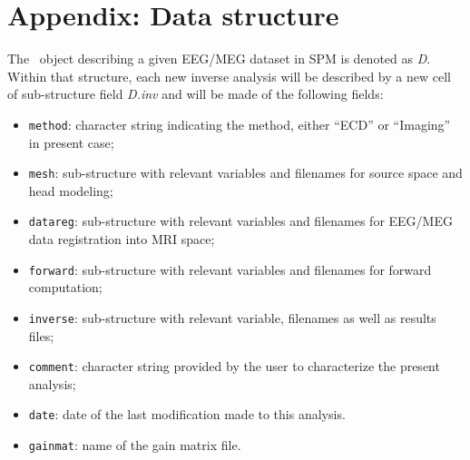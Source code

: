 \section{Appendix: Data structure}
The \matlab\ object describing a given EEG/MEG dataset in SPM is denoted as \textit{D}.
Within that structure, each new inverse analysis will be described by a new cell of sub-structure
field \textit{D.inv} and will be made of the following fields:

\begin{itemize}
    \item \texttt{method}: character string indicating the method, either ``ECD'' or ``Imaging'' in present case;
    \item \texttt{mesh}: sub-structure with relevant variables and filenames for source space and head modeling;
    \item \texttt{datareg}: sub-structure with relevant variables and filenames for EEG/MEG data registration into MRI space;
    \item \texttt{forward}: sub-structure with relevant variables and filenames for forward computation;
    \item \texttt{inverse}: sub-structure with relevant variable, filenames as well as results files;
    \item \texttt{comment}: character string provided by the user to characterize the present analysis;
    \item \texttt{date}: date of the last modification made to this analysis.
    \item \texttt{gainmat}: name of the gain matrix file.
\end{itemize}
